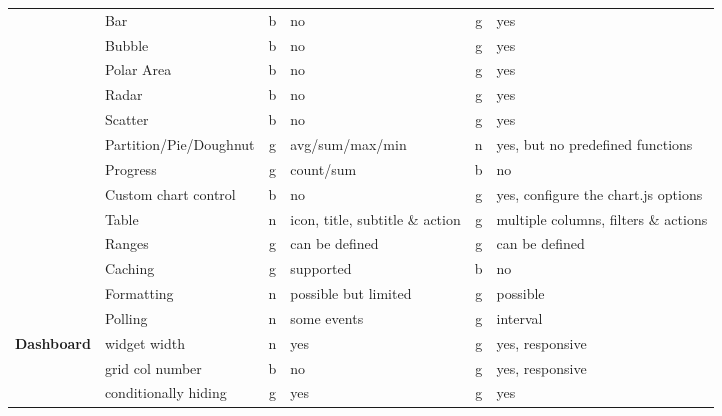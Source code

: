 \begin{table}[!ht]
{\begin{tabular}{llclcl}
            & Bar                    & b  & no                             & g  & yes                                     \\
            & Bubble                 & b  & no                             & g  & yes                                     \\
            & Polar Area             & b  & no                             & g  & yes                                     \\
            & Radar                  & b  & no                             & g  & yes                                     \\
            & Scatter                & b  & no                             & g  & yes                                     \\
            & Partition/Pie/Doughnut & g  & avg/sum/max/min                & n  & yes, but no predefined functions        \\
            & Progress               & g  & count/sum                      & b  & no                                      \\
            & Custom chart control   & b  & no                             & g  & yes, configure the chart.js options     \\
            & Table                  & n  & icon, title, subtitle \& action & g  & multiple columns, filters \& actions     \\
            & Ranges                 & g  & can be defined                 & g  & can be defined                          \\
            & Caching                & g  & supported                      & b  & no                                      \\
            & Formatting             & n  & possible but limited           & g  & possible                                \\
            & Polling                & n  & some events                    & g  & interval                                \\
            \hline
            \multirow{3}{*}{\textbf{Dashboard}}      & widget width           & n  & yes                            & g  & yes, responsive                         \\
            & grid col number        & b  & no                             & g  & yes, responsive                         \\
            & conditionally hiding   & g  & yes                            & g  & yes                                     \\

\end{tabular}}
\end{table}
